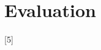 \documentclass{ieeetran}
\begin{document}

\section{Evaluation}
\blindtext[2]
[5]
\blindtext[1]





\end{document}

